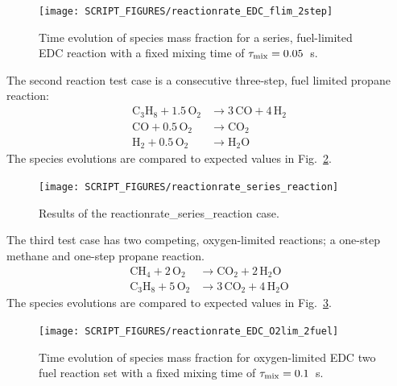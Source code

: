 \documentclass[11pt]{book}
\begin{document}
\begin{figure}[!ht]
\centering
\texttt{[image: SCRIPT\_FIGURES/reactionrate\_EDC\_flim\_2step]}
\caption[Species evolution in 2-step methane EDC reaction]{Time evolution of species mass fraction for a series, fuel-limited EDC reaction with a fixed mixing time of $\tau_{\rm mix}=0.05$~s.}
\label{fig:EDC_2Step_fuel}
\end{figure}

The second reaction test case is a consecutive three-step, fuel limited propane reaction:
\begin{align}\label{eq:3step_propane}
\mathrm{C_3H_8 + 1.5 \, O_2} &\rightarrow  \mathrm{3 \,CO + 4 \, H_2} \\
\nonumber \mathrm{CO + 0.5 \, O_2} &\rightarrow \mathrm{CO_2} \\
\nonumber \mathrm{H_2 + 0.5 \, O_2} &\rightarrow \mathrm{H_2O}
\end{align}
The species evolutions are compared to expected values in Fig.~\ref{fig:reactionrate_series_reaction}.

\begin{figure}[!ht]
\centering
\texttt{[image: SCRIPT\_FIGURES/reactionrate\_series\_reaction]}
\caption[Results of the {\ct reactionrate\_series\_reaction} case]{Results of the {\ct reactionrate\_series\_reaction} case.}
\label{fig:reactionrate_series_reaction}
\end{figure}

The third test case has two competing, oxygen-limited reactions; a one-step methane and one-step propane reaction.
\begin{align}\label{eq:2step_o2_lim}
\mathrm{CH_4 + 2 \, O_2} &\rightarrow  \mathrm{CO_2 + 2 \, H_2O} \\
\nonumber \mathrm{C_3H_8 + 5 \, O_2} &\rightarrow \mathrm{3 \,CO_2 + 4 \, H_2O}
\end{align}
The species evolutions are compared to expected values in Fig.~\ref{fig:EDC_2Step_ox}.

\begin{figure}[!ht]
\centering
\texttt{[image: SCRIPT\_FIGURES/reactionrate\_EDC\_O2lim\_2fuel]}
\caption[Species evolution in two parallel EDC reactions]{Time evolution of species mass fraction for oxygen-limited EDC two fuel reaction set with a fixed mixing time of $\tau_{\rm mix}=0.1$~s.}
\label{fig:EDC_2Step_ox}
\end{figure}
\end{document}
